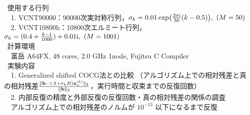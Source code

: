 

\textcolor{structure.fg}{\textbullet} \ 使用する行列\cite{ref-ELSES-matrix}\\
	　1. VCNT90000：$90000$次実対称行列，$\sigma_k = 0.01 \exp(\frac{2 \pi \i}{50}(k-0.5)),\ (M=50)$\\
	　2. VCNT10800h：$10800$次エルミート行列，$\sigma_k =(0.4+\frac{k-1}{1000}) + 0.01\i,\ (M=1001)$\\
\textcolor{structure.fg}{\textbullet} \ 計算環境\\
	　富岳 A64FX, 48 cores, 2.0 GHz 1node, Fujitsu C Compiler\\
\textcolor{structure.fg}{\textbullet} \ 実験内容\\
	　1. Generalized shifted COCG法との比較
	（アルゴリズム上での相対残差と真の相対残差$\frac{\|\vb{b}-(A+\sigma_{k}B)\vb{x}_{n}^{(k)}\|_2}{\|\vb{b}\|_2}$，実行時間と収束までの反復回数）\\
	　2. 内部反復の精度と外部反復の反復回数・真の相対残差の関係の調査\\
	　アルゴリズム上での相対残差のノルムが $10^{-13}$ 以下になるまで反復

%
%


\begin{comment}

\begin{itemize}
	\item 使用する行列\\
		1. VCNT90000：$90000$次実対称行列\\
		2. VCNT10800h：$10800$次エルミート行列
	\item 計算環境\\
		富岳 A64FX, 48 cores, 2.0 GHz 1node, Fujitsu C Compiler
	\item 実験内容\\
		1. Generalized shifted COCG法との比較（相対残差$\frac{\|\vb{b}-(A+\sigma_{k}B)\vb{x}_{n}^{(k)}\|_2}{\|\vb{b}\|_2}$，実行時間）\\
		2. 内部反復の精度と外部反復の反復回数・真の相対残差の関係の調査
\end{itemize}

\end{comment}

